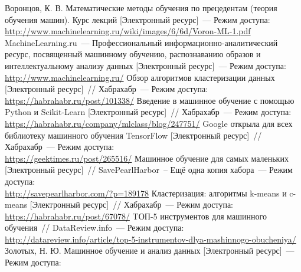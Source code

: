 \newpage
\renewcommand{\refname}{Список использованной литературы}
\begin{thebibliography}{9}
   Воронцов, К. В. Математические методы обучения по прецедентам (теория обучения машин). Курс лекций [Электронный ресурс]~--- Режим доступа:
  \emindent\url{http://www.machinelearning.ru/wiki/images/6/6d/Voron-ML-1.pdf}
   MachineLearning.ru~--- Профессиональный информационно-аналитический ресурс, посвященный машинному
обучению, распознаванию образов и интеллектуальному анализу данных [Электронный ресурс]~--- Режим доступа:\\
  \emindent\url{http://www.machinelearning.ru/}
   Обзор алгоритмов кластеризации данных [Электронный ресурс]~// Хабрахабр~--- Режим доступа:\\
  \emindent\url{https://habrahabr.ru/post/101338/}
   Введение в машинное обучение с помощью Python и Scikit-Learn [Электронный ресурс]~// Хабрахабр~--- Режим доступа:\\
  \emindent\url{https://habrahabr.ru/company/mlclass/blog/247751/}
   Google открыла для всех библиотеку машинного обучения TensorFlow [Электронный ресурс]~// Хабрахабр~--- Режим доступа:\\
  \emindent\url{https://geektimes.ru/post/265516/}
   Машинное обучение для самых маленьких [Электронный ресурс]~// SavePearlHarbor~-- Ещё одна копия хабора~--- Режим доступа:\\
  \emindent\url{http://savepearlharbor.com/?p=189178}
   Кластеризация: алгоритмы k-means и c-means [Электронный ресурс]~// Хабрахабр~--- Режим доступа:\\
  \emindent\url{https://habrahabr.ru/post/67078/}
   TОП-5 инструментов для машинного обучения~// DataReview.info~--- Режим доступа:\\
  \emindent\url{http://datareview.info/article/top-5-instrumentov-dlya-mashinnogo-obucheniya/}
   Золотых, Н. Ю. Машинное обучение и анализ данных [Электронный ресурс]~--- Режим доступа:\\

\end{thebibliography}
